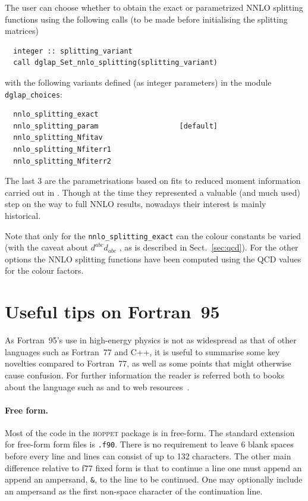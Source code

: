 \documentclass[12pt]{article}
\newcommand{\hoppet}{\textsc{hoppet}\xspace}
\newcommand{\ttt}[1]{\texttt{#1}}
\begin{document}
The user can choose whether to obtain the exact or parametrized NNLO
splitting functions using the following calls (to be made before
initialising the splitting matrices)
\begin{lstlisting}
  integer :: splitting_variant
  call dglap_Set_nnlo_splitting(splitting_variant)
\end{lstlisting}
with the following variants defined (as integer parameters) in the
module \ttt{dglap\_choices}:
\begin{lstlisting}
  nnlo_splitting_exact
  nnlo_splitting_param                   [default]
  nnlo_splitting_Nfitav
  nnlo_splitting_Nfiterr1
  nnlo_splitting_Nfiterr2
\end{lstlisting}
The last 3 are the parametrisations based on fits to reduced moment
information carried out in \cite{vanNeerven:1999ca,vanNeerven:2000uj}.
Though at the time they represented a valuable (and much used) step on
the way to full NNLO results, nowadays their interest is mainly
historical.

Note that only for the \ttt{nnlo\_splitting\_exact} can the colour
constants be varied (with the caveat about $d^{abc}d_{abc}$ , as is
described in Sect.~\ref{sec:qcd}). For the other options the
NNLO splitting functions have been computed using the QCD values
for the colour factors.

\section{Useful tips on Fortran~95}
\label{sec:f95appendix}

As Fortran~95's use in high-energy physics is not as widespread as
that of other languages such as Fortran~77 and C++, it is useful to
summarise some key novelties compared to Fortran~77, as well as some
points that might otherwise cause confusion. For further information
the reader is referred both to books about the language such as
\cite{F95Explained} and to web resources~\cite{F95WebResources}.

\paragraph{Free form.}  Most of the code in the \hoppet package is in
free-form. The standard extension for free-form form files is
\ttt{.f90}. There is no requirement to leave 6 blank spaces before
every line and lines can consist of up to 132 characters. The other
main difference relative to f77 fixed form is that to continue a line
one must append an append an ampersand, \ttt{\&}, to the line to be
continued. One may optionally include an ampersand as the first
non-space character of the continuation line.
\end{document}
